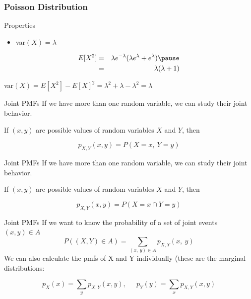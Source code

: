 \documentclass[handout]{beamer}
\numberwithin{equation}{section}
\begin{document}
\begin{frame}

\frametitle{Poisson Distribution}
Properties
\begin{itemize}
\item[3)] var$(X) = \lambda$
\end{itemize}

\begin{eqnarray}
E[X^2] & = & \lambda e^{-\lambda} (\lambda e^{\lambda} + e^{\lambda} ) \nonumber \pause \\
& = & \lambda (\lambda  + 1 ) \nonumber 
\end{eqnarray}


var$(X) = E[X^2] - E[X]^2 = \lambda^2 + \lambda  - \lambda^2  = \lambda$





\end{frame}



\begin{frame}{Joint PMFs}
If we have more than one random variable, we can study their joint behavior.

If $(x,y)$ are possible values of random variables $X$ and $Y$, then 

$$p_{X,Y}(x, y)=P(X=x,\ Y=y)$$

\end{frame}

\begin{frame}{Joint PMFs}
If we have more than one random variable, we can study their joint behavior.

If $(x,y)$ are possible values of random variables $X$ and $Y$, then 

$$p_{X,Y}(x, y)=P(X=x \cap Y=y)$$

\end{frame}

\begin{frame}{Joint PMFs}
If we want to know the probability of a set of joint events $(x, y) \in A$
$$P((X,Y)\in A)=\sum_{(x,\ y)\in A} p_{X,Y} (x,\ y)$$
We can also calculate the pmfs of X and Y individually (these are the marginal distributions:

$$p_X(x)=\sum_y p_{X,Y}(x, y), \ \ \quad p_Y(y)=\sum_x p_{X,Y}(x, y)$$

\end{frame}
\end{document}
